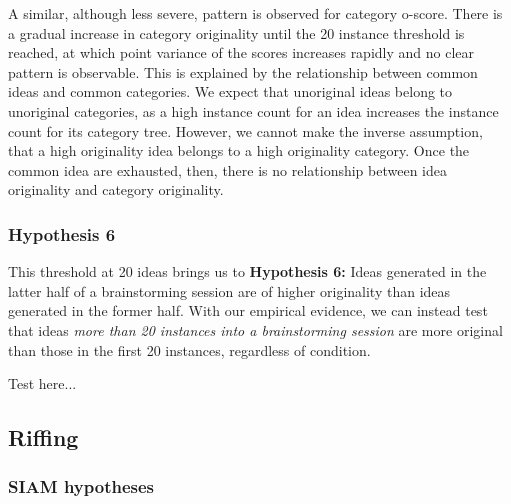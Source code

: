 A similar, although less severe, pattern is observed for category o-score. There is a gradual increase in category originality until the 20 instance threshold is reached, at which point variance of the scores increases rapidly and no clear pattern is observable. This is explained by the relationship between common ideas and common categories. We expect that unoriginal ideas belong to unoriginal categories, as a high instance count for an idea increases the instance count for its category tree. However, we cannot make the inverse assumption, that a high originality idea belongs to a high originality category. Once the common idea are exhausted, then, there is no relationship between idea originality and category originality.

\subsubsection{Hypothesis 6}

This threshold at 20 ideas brings us to \textbf{Hypothesis 6:} Ideas generated in the latter half of a brainstorming session are of higher originality than ideas generated in the former half. With our empirical evidence, we can instead test that ideas \emph{more than 20 instances into a brainstorming session} are more original than those in the first 20 instances, regardless of condition.

Test here...

\subsection{Riffing}


\subsubsection{SIAM hypotheses}

\cite{nijstad_how_2006}